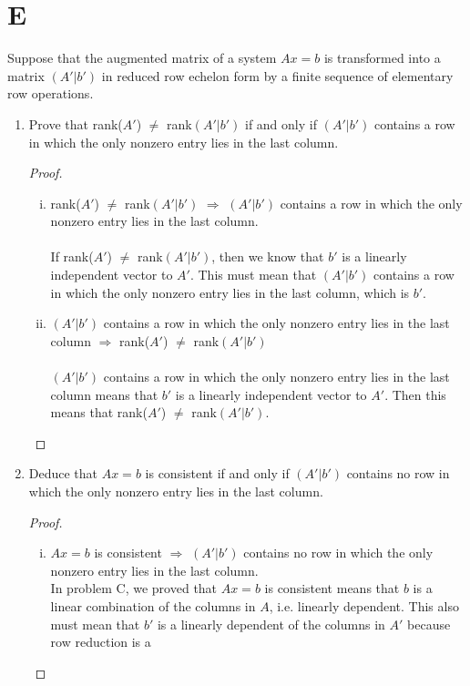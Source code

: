 \documentclass[11pt]{scrartcl}
\begin{document}
\section{E}
Suppose that the augmented matrix of a system $Ax = b$ is transformed into a matrix $(A'|b')$ in reduced row
echelon form by a finite sequence of elementary row operations.
\begin{enumerate}[label=\alph*.]
	\item{
		Prove that rank($A'$) $\neq$ rank$(A'|b')$ if and only if $(A'|b')$ contains a row in which the only nonzero entry lies
		in the last column.
		\begin{proof}\
			\begin{enumerate}[i.]
				\item{
					rank($A'$) $\neq$ rank$(A'|b')$ $\Rightarrow$ $(A'|b')$ contains a row in which the only nonzero entry lies
					in the last column.\\\-\\
					If rank($A'$) $\neq$  rank$(A'|b')$, then we know that $b'$ is a linearly independent vector to $A'$.
					This must mean that $(A'|b')$ contains a row in which the only nonzero entry lies
					in the last column, which is $b'$.
				}
				\item{
					$(A'|b')$ contains a row in which the only nonzero entry lies
					in the last column $\Rightarrow$ rank($A'$) $\neq$ rank$(A'|b')$ \\\-\\
					$(A'|b')$ contains a row in which the only nonzero entry lies
					in the last column means that $b'$ is a linearly independent vector to $A'$. Then this means that 
					rank($A'$) $\neq$ rank$(A'|b')$.
				}
			\end{enumerate}
		\end{proof}
	}
	\item{
		Deduce that $Ax = b$ is consistent if and only if $(A'|b')$ contains no row in which the only nonzero entry lies
		in the last column.
		\begin{proof}\
			\begin{enumerate}[i.]
				\item{
					$Ax = b$ is consistent $\Rightarrow$  $(A'|b')$ contains no row in which the only nonzero entry lies
					in the last column.\\
					In problem C, we proved that 
					$Ax = b$ is consistent means that $b$ is a linear combination of the columns in $A$, i.e. linearly dependent. This also must mean that
					$b'$ is a linearly dependent of the columns in $A'$	because row reduction is a 
}
\end{enumerate}
\end{proof}}
\end{enumerate}
\end{document}
